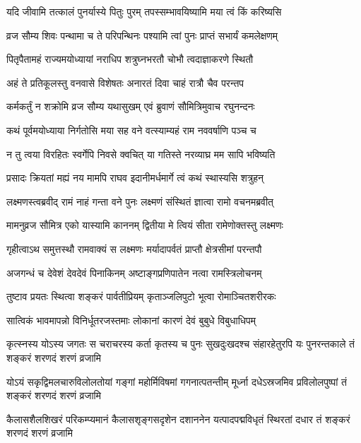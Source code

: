\twolineshloka
{यदि जीवामि तत्कालं पुनर्यास्ये पितुः पुरम्}
{तपस्सम्भावयिष्यामि मया त्वं किं करिष्यसि} %

\twolineshloka
{व्रज सौम्य शिवः पन्थामा च ते परिपन्थिनः}
{पश्यामि त्वां पुनः प्राप्तं सभार्यं कमलेक्षणम्} %

\twolineshloka
{पितृपैतामहं राज्यमयोध्यायां नराधिप}
{शत्रुघ्नभरतौ चोभौ त्वदाज्ञाकरणे स्थितौ} %

\twolineshloka
{अहं ते प्रतिकूलस्तु वनवासे विशेषतः}
{अनारतं दिवा चाहं रात्रौ चैव परन्तप} %

\twolineshloka
{कर्मकर्तुं न शक्रोमि व्रज सौम्य यथासुखम्}
{एवं ब्रुवाणं सौमित्रिमुवाच रघुनन्दनः} %

\twolineshloka
{कथं पूर्वमयोध्याया निर्गतोसि मया सह}
{वने वत्स्याम्यहं राम नववर्षाणि पञ्च च} %

\twolineshloka
{न तु त्वया विरहितः स्वर्गेपि निवसे क्वचित्}
{या गतिस्ते नरव्याघ्र मम सापि भविष्यति} %

\twolineshloka
{प्रसादः क्रियतां मह्यं नय मामपि राघव}
{इदानीमर्धमार्गे त्वं कथं स्थास्यसि शत्रुहन्} %

\twolineshloka
{लक्ष्मणस्त्वब्रवीद् रामं नाहं गन्ता वने पुनः}
{लक्ष्मणं संस्थितं ज्ञात्वा रामो वचनमब्रवीत्} %

\twolineshloka
{मामनुव्रज सौमित्र एको यास्यामि काननम्}
{द्वितीया मे त्वियं सीता रामेणोक्तस्तु लक्ष्मणः} %

\twolineshloka
{गृहीत्वाऽथ समुत्तस्थौ रामवाक्यं स लक्ष्मणः}
{मर्यादापर्वतं प्राप्तौ क्षेत्रसीमां परन्तपौ} %

\twolineshloka
{अजगन्धं च देवेशं देवदेवं पिनाकिनम्}
{अष्टाङ्गप्रणिपातेन नत्वा रामस्त्रिलोचनम्} %

\twolineshloka
{तुष्टाव प्रयतः स्थित्वा शङ्करं पार्वतीप्रियम्}
{कृताञ्जलिपुटो भूत्वा रोमाञ्चितशरीरकः} %

\twolineshloka
{सात्विकं भावमापन्नो विनिर्धूतरजस्तमाः}
{लोकानां कारणं देवं बुबुधे विबुधाधिपम्} %

\twolineshloka
{कृत्स्नस्य योऽस्य जगतः स चराचरस्य कर्ता कृतस्य च पुनः सुखदुःखदश्च}
{संहारहेतुरपि यः पुनरन्तकाले तं शङ्करं शरणदं शरणं व्रजामि} %

\twolineshloka
{योऽयं सकृद्विमलचारुविलोलतोयां गङ्गां महोर्मिविषमां गगनात्पतन्तीम्}
{मूर्ध्ना दधेऽस्रजमिव प्रविलोलपुष्पां तं शङ्करं शरणदं शरणं व्रजामि} %

\twolineshloka
{कैलासशैलशिखरं परिकम्प्यमानं कैलासशृङ्गसदृशेन दशाननेन}
{यत्पादपद्मविधृतं स्थिरतां दधार तं शङ्करं शरणदं शरणं व्रजामि} %

